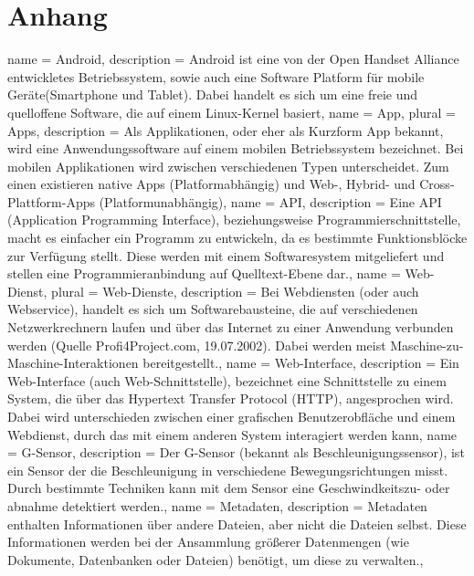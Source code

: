 \chapter{Anhang}
\printglossaries
{}
{
  name = Android,
  description = {Android ist eine von der Open Handset Alliance entwickletes Betriebssystem, sowie auch eine Software Platform für mobile Geräte(\gls{Smartphone} und \gls{Tablet}). Dabei handelt es sich um eine freie und quelloffene Software, die auf einem Linux-Kernel basiert},
}
{
  name = App,
  plural = Apps,
  description = {Als Applikationen, oder eher als Kurzform App bekannt, wird eine Anwendungssoftware auf einem mobilen Betriebssystem bezeichnet. Bei mobilen Applikationen wird zwischen verschiedenen Typen unterscheidet. Zum einen existieren native Apps (Platformabhängig) und Web-, Hybrid- und Cross-Plattform-Apps (Platformunabhängig)},
}
{
  name = API,
  description = {Eine API (Application Programming Interface), beziehungsweise Programmierschnittstelle, macht es einfacher ein Programm zu entwickeln, da es bestimmte Funktionsblöcke zur Verfügung stellt. Diese werden mit einem Softwaresystem mitgeliefert und stellen eine Programmieranbindung auf Quelltext-Ebene dar.},
}
{
  name = Web-Dienst,
  plural = Web-Dienste,
  description = {Bei Webdiensten (oder auch Webservice), handelt es sich um Softwarebausteine, die auf verschiedenen Netzwerkrechnern laufen und über das Internet zu einer Anwendung verbunden werden (Quelle Profi4Project.com, 19.07.2002). Dabei werden meist Maschine-zu-Maschine-Interaktionen bereitgestellt.},
}
{
  name = Web-Interface,
  description = {Ein Web-Interface (auch Web-Schnittstelle), bezeichnet eine Schnittstelle zu einem System, die über das Hypertext Transfer Protocol (HTTP), angesprochen wird. Dabei wird unterschieden zwischen einer grafischen Benutzerobfläche und einem \gls{Webdienst}, durch das mit einem anderen System interagiert werden kann},
}
{
  name = G-Sensor,
  description = {Der G-Sensor (bekannt als Beschleunigungssensor), ist ein Sensor der die Beschleunigung in verschiedene Bewegungsrichtungen misst. Durch bestimmte Techniken kann mit dem Sensor eine Geschwindkeitszu- oder abnahme detektiert werden.},
}
{
  name = Metadaten,
  description = {Metadaten enthalten Informationen über andere Dateien, aber nicht die Dateien selbst. Diese Informationen werden bei der Ansammlung größerer Datenmengen (wie Dokumente, Datenbanken oder Dateien) benötigt, um diese zu verwalten.},
}
